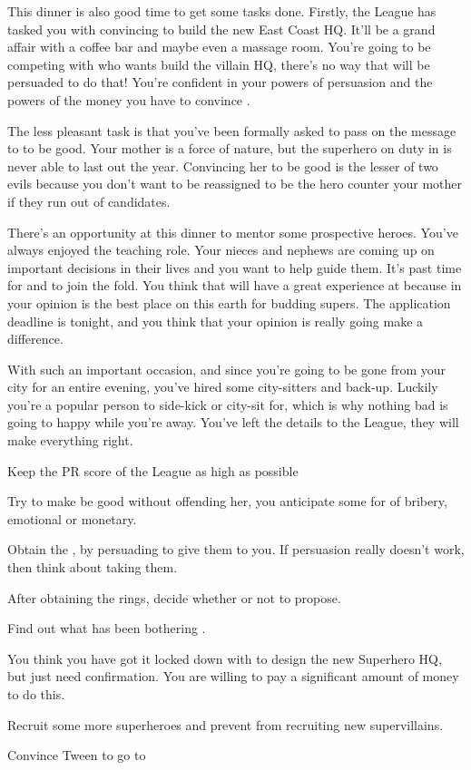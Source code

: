 \documentclass[char]{LRSguildcamp1}
\begin{document}
This dinner is also good time to get some tasks done. Firstly, the League has tasked you with convincing \cArchitect{} to build the new East Coast HQ. It'll be a grand affair with a coffee bar and maybe even a massage room. You're going to be competing with \cOldest{} who wants \cArchitect{} build the villain HQ, there's no way that \cArchitect{} will be persuaded to do that! You're confident in your powers of persuasion and the powers of the money you have to convince \cArchitect{}. 

The less pleasant task is that you've been formally asked to pass on the message to \cGrandma{} to be good. Your mother is a force of nature, but the superhero on duty in \pCityGrandma{} is never able to last out the year. Convincing her to be good is the lesser of two evils because you don't want to be reassigned to be the hero counter your mother if they run out of candidates. 

There's an opportunity at this dinner to mentor some prospective heroes. You've always enjoyed the teaching role. Your nieces and nephews are coming up on important decisions in their lives and you want to help guide them. It's past time for \cGrad{} and \cTeen{} to join the fold. You think that \cTween{} will have a great experience at \pSuperSchool{} because in your opinion \pSuperSchool{} is the best place on this earth for budding supers. The application deadline is tonight, and you think that your opinion is really going make a difference. 

With such an important occasion, and since you're going to be gone from your city for an entire evening, you've hired some city-sitters and back-up. Luckily you're a popular person to side-kick or city-sit for, which is why nothing bad is going to happy while you're away. You've left the details to the League, they will make everything right. 

\begin{itemz}[Goals]
	\item Keep the PR score of the League as high as possible
	\item Try to make \cGrandma{} be good without offending her, you anticipate some for of bribery, emotional or monetary. 
	\item Obtain the \iEngagementRings{}, by persuading \cGrandma{} to give them to you. If persuasion really doesn't work, then think about taking them. 
	\item After obtaining the rings, decide whether or not to propose. 
	\item Find out what has been bothering \cYS{}. 
	\item You think you have got it locked down with \cArchitect{} to design the new Superhero HQ, but just need confirmation. You are willing to pay a significant amount of money to do this.  
	\item  Recruit some more superheroes and prevent \cOldest{} from recruiting new supervillains.
	\item Convince Tween to go to \pSuperSchool{} 
	
\end{itemz}
\end{document}
